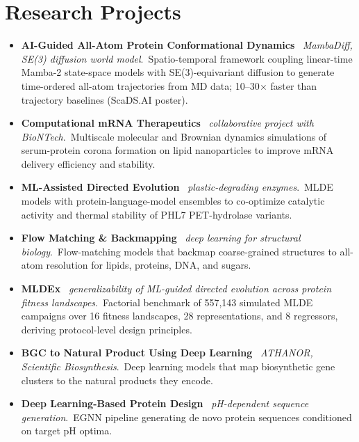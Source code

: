 \documentclass[10pt,a4paper]{article}
\newcommand{\project}[3]{\item \textbf{#1} \textendash\ \textit{#2}.\ #3}
\begin{document}
\section{Research Projects}
\begin{itemize}[itemsep=2pt]
  \project{AI-Guided All-Atom Protein Conformational Dynamics}{MambaDiff, SE(3) diffusion world model}{Spatio-temporal
        framework coupling linear-time Mamba-2 state-space models with SE(3)-equivariant diffusion to generate time-ordered
        all-atom trajectories from MD data; 10–30$\times$ faster than trajectory baselines (ScaDS.AI poster).}
  \project{Computational mRNA Therapeutics}{collaborative project with BioNTech}{Multiscale molecular and Brownian dynamics
        simulations of serum-protein corona formation on lipid nanoparticles to improve mRNA delivery efficiency and stability.}
  \project{ML-Assisted Directed Evolution}{plastic-degrading enzymes}{MLDE models with protein-language-model ensembles
        to co-optimize catalytic activity and thermal stability of PHL7 PET-hydrolase variants.}
  \project{Flow Matching \& Backmapping}{deep learning for structural biology}{Flow-matching models that backmap
        coarse-grained structures to all-atom resolution for lipids, proteins, DNA, and sugars.}
  \project{MLDEx}{generalizability of ML-guided directed evolution across protein fitness landscapes}{Factorial
        benchmark of 557,143 simulated MLDE campaigns over 16 fitness landscapes, 28 representations, and 8 regressors,
        deriving protocol-level design principles.}
  \project{BGC to Natural Product Using Deep Learning}{ATHANOR, Scientific Biosynthesis}{Deep learning models that map
        biosynthetic gene clusters to the natural products they encode.}
  \project{Deep Learning-Based Protein Design}{pH-dependent sequence generation}{EGNN pipeline generating de novo
        protein sequences conditioned on target pH optima.}
\end{itemize}

\end{document}
